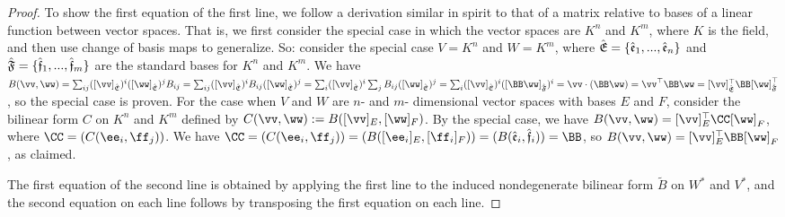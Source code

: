 \begin{proof}
  
    To show the first equation of the first line, we follow a derivation similar in spirit to that of a matrix relative to bases of a linear function between vector spaces. That is, we first consider the special case in which the vector spaces are $K^n$ and $K^m$, where $K$ is the field, and then use change of basis maps to generalize. So: consider the special case $V = K^n$ and $W = K^m$, where ${\hat{\mathfrak{E}}} = \{\hat{\mathfrak{e}}_1, ..., \hat{\mathfrak{e}}_n\}$ and ${\hat{\mathfrak{F}}} = \{\hat{\mathfrak{f}}_1, ..., \hat{\mathfrak{f}}_m\}$ are the standard bases for $K^n$ and $K^m$. We have $B(\vv, \ww) = \sum_{ij} ([\vv]_\sE)^i ([\ww]_\sE)^j B_{ij} = \sum_{ij} ([\vv]_\sE)^i B_{ij} ([\ww]_\sE)^j = \sum_i ([\vv]_\sE)^i \sum_j B_{ij} ([\ww]_\sE)^j = \sum_i ([\vv]_\sE)^i ([\BB \ww]_\sF)^i = \vv \cdot (\BB \ww) = \vv^\top \BB \ww = [\vv]_\sE^\top \BB [\ww]_\sF^\top$, so the special case is proven. For the case when $V$ and $W$ are $n$- and $m$- dimensional vector spaces with bases $E$ and $F$, consider the bilinear form $C$ on $K^n$ and $K^m$ defined by $C(\vv, \ww) := B([\vv]_E, [\ww]_F)$. By the special case, we have $B(\vv, \ww) = [\vv]_E^\top \CC [\ww]_F$, where $\CC = (C(\ee_i, \ff_j))$. We have $\CC = (C(\ee_i, \ff_j)) = (B([\ee_i]_E, [\ff_i]_F)) = (B(\see_i, \sff_i)) = \BB$, so $B(\vv, \ww) = [\vv]_E^\top \BB [\ww]_F$, as claimed.
    
    The first equation of the second line is obtained by applying the first line to the induced nondegenerate bilinear form $\widetilde{B}$ on $W^*$ and $V^*$, and the second equation on each line follows by transposing the first equation on each line.
\end{proof}
 
